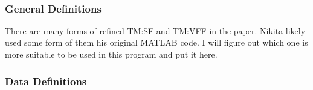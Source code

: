\documentclass[12pt]{article}
\begin{document}
~\newline

\subsubsection{General Definitions}\label{sec_gendef}

There are many forms of refined TM:SF and TM:VFF in the paper. Nikita likely used some form of them his original MATLAB code. I will figure out which one is more suitable to be used in this program and put it here.






\subsubsection{Data Definitions}\label{sec_datadef}

\end{document}
